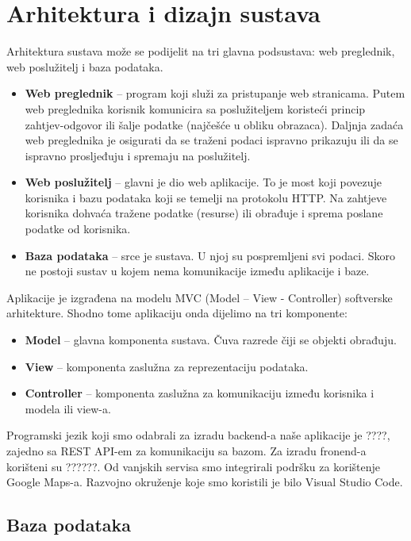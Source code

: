 \chapter{Arhitektura i dizajn sustava}
		
		Arhitektura sustava može se podijelit na tri glavna podsustava: web preglednik, web poslužitelj i baza podataka.
	\begin{itemize}
		\item 	\textbf{Web preglednik} – program koji služi za pristupanje web stranicama. Putem web preglednika korisnik komunicira sa poslužiteljem koristeći princip zahtjev-odgovor ili šalje podatke (najčešće u obliku obrazaca). Daljnja zadaća web preglednika je osigurati da se traženi podaci ispravno prikazuju ili da se ispravno prosljeđuju i spremaju na poslužitelj.
		\item 	\textbf{Web poslužitelj} – glavni je dio web aplikacije. To je most koji povezuje korisnika i bazu podataka koji se temelji na protokolu HTTP. Na zahtjeve korisnika dohvaća tražene podatke (resurse) ili obrađuje i sprema poslane podatke od korisnika.
		\item 	\textbf{Baza podataka} – srce je sustava. U njoj su pospremljeni svi podaci. Skoro ne postoji sustav u kojem nema komunikacije između aplikacije i baze.	
	\end{itemize}
		Aplikacije je izgrađena na modelu MVC (Model – View - Controller) softverske arhitekture. Shodno tome aplikaciju onda dijelimo na tri komponente:
	\begin{itemize}
		\item	\textbf{Model} – glavna komponenta sustava. Čuva razrede čiji se objekti obrađuju.
		\item	\textbf{View} – komponenta zaslužna za reprezentaciju podataka.
		\item	\textbf{Controller} – komponenta zaslužna za komunikaciju između korisnika i modela ili view-a.
	\end{itemize}
	
		\smallskip
		Programski jezik koji smo odabrali za izradu backend-a naše aplikacije je ????, zajedno sa REST API-em za komunikaciju sa bazom. Za izradu fronend-a korišteni su ??????. Od vanjskih servisa smo integrirali podršku za korištenje Google Maps-a. Razvojno okruženje koje smo koristili je bilo Visual Studio Code.
		

		

				
		\section{Baza podataka}
			
